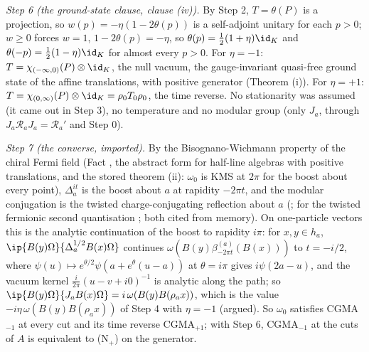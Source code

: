 \emph{Step 6 (the ground-state clause, clause (iv)).} By Step 2, $T = \theta(P)$ is a projection, so $w(p) = -\eta(1 - 2\theta(p))$ is a self-adjoint unitary for each $p > 0$; $w \ge 0$ forces $w = 1$, $1 - 2\theta(p) = -\eta$, so $\theta(p) = \tfrac12(1 + \eta)\id_{K}$ and $\theta(-p) = \tfrac12(1 - \eta)\id_{K}$ for almost every $p > 0$. For $\eta = -1$: $T = \chi_{(-\infty, 0)}(P)\otimes\id_{K}$, the null vacuum, the gauge-invariant quasi-free ground state of the affine translations, with positive generator (Theorem (i)). For $\eta = +1$: $T = \chi_{(0, \infty)}(P)\otimes\id_{K} = \rho_{0}T_{0}\rho_{0}$, the time reverse. No stationarity was assumed (it came out in Step 3), no temperature and no modular group (only $J_{a}$, through $J_{a}\mathcal{R}_{a}J_{a} = \mathcal{R}_{a}'$ and Step 0).

\emph{Step 7 (the converse, imported).} By the Bisognano-Wichmann property of the chiral Fermi field (Fact , the abstract form for half-line algebras with positive translations, and the stored theorem (ii): $\omega_{0}$ is KMS at $2\pi$ for the boost about every point), $\Delta_{a}^{it}$ is the boost about $a$ at rapidity $-2\pi t$, and the modular conjugation is the twisted charge-conjugating reflection about $a$ (\cite{BGL1993}; for the twisted fermionic second quantisation \cite{BJL2002}; both cited from memory). On one-particle vectors this is the analytic continuation of the boost to rapidity $i\pi$: for $x, y \in h_{a}$, $\ip{B(y)\Omega}{\Delta_{a}^{1/2}B(x)\Omega}$ continues $\omega(B(y)\beta^{(a)}_{-2\pi t}(B(x)))$ to $t = -i/2$, where $\psi(u) \mapsto e^{\theta/2}\psi(a + e^{\theta}(u - a))$ at $\theta = i\pi$ gives $i\psi(2a - u)$, and the vacuum kernel $\tfrac{i}{2\pi}(u - v + i0)^{-1}$ is analytic along the path; so $\ip{B(y)\Omega}{J_{a}B(x)\Omega} = i\,\omega(B(y)B(\rho_{a}x))$, which is the value $-i\eta\,\omega(B(y)B(\rho_{a}x))$ of Step 4 with $\eta = -1$ (argued). So $\omega_{0}$ satisfies CGMA$_{-1}$ at every cut and its time reverse CGMA$_{+1}$; with Step 6, CGMA$_{-1}$ at the cuts of $A$ is equivalent to (N$_{+}$) on the generator.

